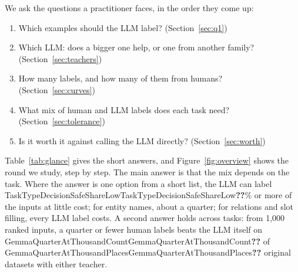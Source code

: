 \documentclass[11pt]{article}
\newcommand{\res}[1]{\ifcsname #1\endcsname\csname #1\endcsname\else\textbf{??}\fi}
\begin{document}
We ask the questions a practitioner faces, in the order they come up:
\begin{enumerate}
\item Which examples should the LLM label? (Section~\ref{sec:q1})
\item Which LLM: does a bigger one help, or one from another family? (Section~\ref{sec:teachers})
\item How many labels, and how many of them from humans? (Section~\ref{sec:curves})
\item What mix of human and LLM labels does each task need? (Section~\ref{sec:tolerance})
\item Is it worth it against calling the LLM directly? (Section~\ref{sec:worth})
\end{enumerate}
Table~\ref{tab:glance} gives the short answers, and Figure~\ref{fig:overview} shows the round we study, step by step. The main answer is that the mix depends on the task. Where the answer is one option from a short list, the LLM can label \res{TaskTypeDecisionSafeShareLow}\% or more of the inputs at little cost; for entity names, about a quarter; for relations and slot filling, every LLM label costs. A second answer holds across tasks: from 1{,}000 ranked inputs, a quarter or fewer human labels beats the LLM itself on \res{GemmaQuarterAtThousandCount} of \res{GemmaQuarterAtThousandPlaces} original datasets with either teacher.
\end{document}
